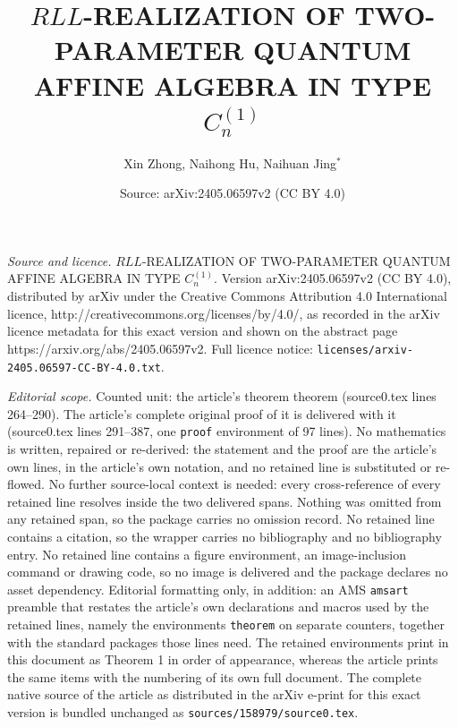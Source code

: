 \documentclass[10pt,a4paper]{amsart}
\title{$RLL$-REALIZATION OF TWO-PARAMETER QUANTUM AFFINE ALGEBRA IN TYPE $C_n^{(1)}$}
\author{Xin Zhong, Naihong Hu, Naihuan Jing$^*$}
\date{Source: arXiv:2405.06597v2 (CC BY 4.0)}
\begin{document}
\maketitle

\noindent\emph{Source and licence.} $RLL$-REALIZATION OF TWO-PARAMETER QUANTUM AFFINE ALGEBRA IN TYPE $C_n^{(1)}$. Version arXiv:2405.06597v2 (CC BY 4.0), distributed by arXiv under the Creative Commons Attribution 4.0 International licence, http://creativecommons.org/licenses/by/4.0/, as recorded in the arXiv licence metadata for this exact version and shown on the abstract page https://arxiv.org/abs/2405.06597v2. Full licence notice: \texttt{licenses/arxiv-2405.06597-CC-BY-4.0.txt}.\par\smallskip

\noindent\textit{Editorial scope.} Counted unit: the article's theorem theorem (source0.tex lines 264--290). The article's complete original proof of it is delivered with it (source0.tex lines 291--387, one \texttt{proof} environment of 97 lines). No mathematics is written, repaired or re-derived: the statement and the proof are the article's own lines, in the article's own notation, and no retained line is substituted or re-flowed.  No further source-local context is needed: every cross-reference of every retained line resolves inside the two delivered spans.  Nothing was omitted from any retained span, so the package carries no omission record.  No retained line contains a citation, so the wrapper carries no bibliography and no bibliography entry.  No retained line contains a figure environment, an image-inclusion command or drawing code, so no image is delivered and the package declares no asset dependency.  Editorial formatting only, in addition: an AMS \texttt{amsart} preamble that restates the article's own declarations and macros used by the retained lines, namely the environments \texttt{theorem} on separate counters, together with the standard packages those lines need.  The retained environments print in this document as Theorem 1 in order of appearance, whereas the article prints the same items with the numbering of its own full document.  The complete native source of the article as distributed in the arXiv e-print for this exact version is bundled unchanged as \texttt{sources/158979/source0.tex}.
\end{document}
